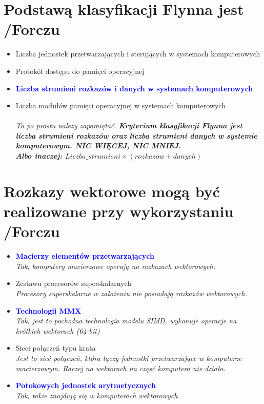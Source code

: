 \section{Podstawą klasyfikacji Flynna jest {\small /Forczu}}
	\begin{itemize}
    \item Liczba jednostek przetwarzających i sterujących w systemach komputerowych
    \item Protokół dostępu do pamięci operacyjnej
    \item \textcolor{Blue}{\textbf{Liczba strumieni rozkazów i danych w systemach komputerowych}}
    \item Liczba modułów pamięci operacyjnej w systemach komputerowych\\\\
    {\small \emph{To po prostu należy zapamiętać. \textbf{Kryterium klasyfikacji Flynna jest \emph{liczba strumieni rozkazów} oraz \emph{liczba strumieni danych} w systemie komputerowym. NIC WIĘCEJ, NIC MNIEJ.\\
    Albo inaczej: \emph{$Liczba\_strumieni\times(rozkazow+danych)$}}}}
    \end{itemize}

\section{Rozkazy wektorowe mogą być realizowane przy wykorzystaniu  {\small /Forczu}}
	\begin{itemize}
    \item \textcolor{Blue}{\textbf{Macierzy elementów przetwarzających}}\\
    {\small \emph{Tak, komputery macierzowe operują na rozkazach wektorowych.}}
    \item Zestawu procesorów superskalarnych\\
    {\small \emph{Procesory superskalarne w założeniu nie posiadają rozkazów wektorowych.}}
    \item \textcolor{Blue}{\textbf{Technologii MMX}}\\
    {\small \emph{Tak, jest to pochodna technologia modelu SIMD, wykonuje operacje na krótkich wektorach (64-bit)}}
    \item Sieci połączeń typu krata\\
    {\small \emph{Jest to sieć połączeń, która łączy jednostki przetwarzające w komputerze macierzowym. Raczej na wektorach na częsć komputera nie działa.}}
    \item \textcolor{Blue}{\textbf{Potokowych jednostek arytmetycznych}}\\
    {\small \emph{Tak, takie znajdują się w komputerach wektorowych.}}
    \end{itemize}

